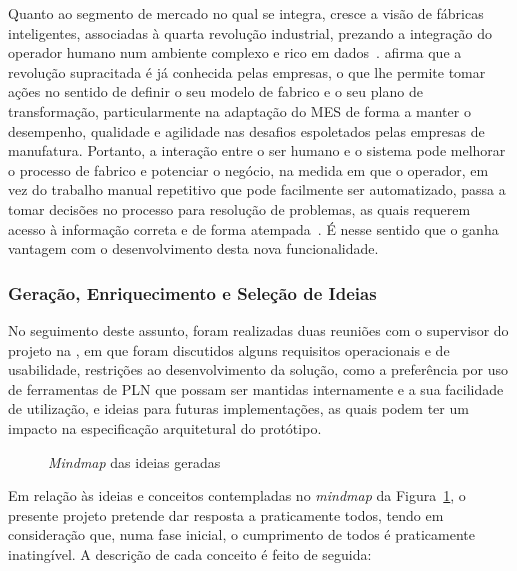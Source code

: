 Quanto ao segmento de mercado no qual se integra, cresce a visão de fábricas inteligentes, associadas à quarta revolução industrial, prezando a integração do operador humano num ambiente complexo e rico em dados~\parencite{social_factory}. \textcite{industry40_revolution_future_mes} afirma que a revolução supracitada é já conhecida pelas empresas, o que lhe permite tomar ações no sentido de definir o seu modelo de fabrico e o seu plano de transformação, particularmente na adaptação do \gls{MES} de forma a manter o desempenho, qualidade e agilidade nas desafios espoletados pelas empresas de manufatura. Portanto, a interação entre o ser humano e o sistema pode melhorar o processo de fabrico e potenciar o negócio, na medida em que o operador, em vez do trabalho manual repetitivo que pode facilmente ser automatizado, passa a tomar decisões no processo para resolução de problemas, as quais requerem acesso à informação correta e de forma atempada~\parencite{social_factory}. É nesse sentido que o {\productname} ganha vantagem com o desenvolvimento desta nova funcionalidade.

\subsubsection*{Geração, Enriquecimento e Seleção de Ideias}

No seguimento deste assunto, foram realizadas duas reuniões com o supervisor do projeto na {\companyname}, em que foram discutidos alguns requisitos operacionais e de usabilidade, restrições ao desenvolvimento da solução, como a preferência por uso de ferramentas de \gls{PLN} que possam ser mantidas internamente e a sua facilidade de utilização, e ideias para futuras implementações, as quais podem ter um impacto na especificação arquitetural do protótipo.

\begin{figure}[!ht]
    \centering
    \resizebox{\textwidth}{!}{}
    \caption{\textit{Mindmap} das ideias geradas}
    \label{fig:mindmap}
\end{figure}

Em relação às ideias e conceitos contempladas no \textit{mindmap} da Figura~\ref{fig:mindmap}, o presente projeto pretende dar resposta a praticamente todos, tendo em consideração que, numa fase inicial, o cumprimento de todos é praticamente inatingível. A descrição de cada conceito é feito de seguida:

